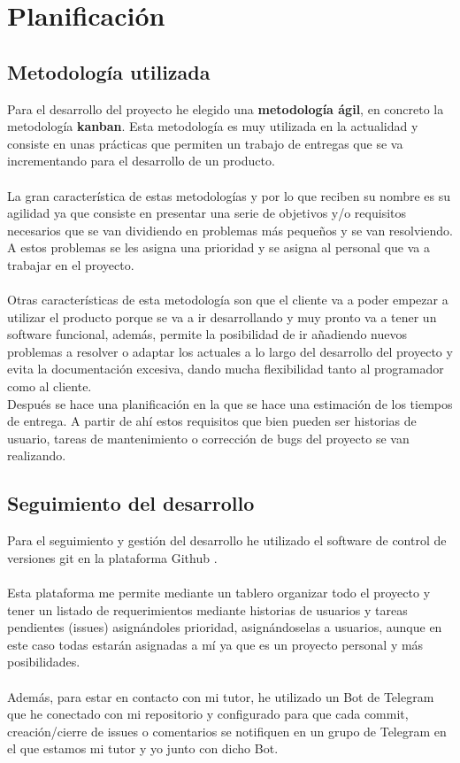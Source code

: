 \chapter{Planificación} \label{sec:planificacion}

\section{Metodología utilizada} \label{sec:metodologia}
Para el desarrollo del proyecto he elegido una \textbf{metodología ágil}, en concreto la metodología \textbf{kanban}.
Esta metodología es muy utilizada en la actualidad y consiste en unas prácticas que permiten un trabajo de entregas que se va incrementando para el desarrollo de un producto. \\\\
La gran característica de estas metodologías y por lo que reciben su nombre es su agilidad ya que consiste en presentar una serie de objetivos y/o requisitos necesarios que se van dividiendo en problemas más pequeños 
y se van resolviendo. A estos problemas se les asigna una prioridad y se asigna al personal que va a trabajar en el proyecto.\\\\
Otras características de esta metodología son que el cliente va a poder empezar a utilizar el producto porque se va a ir desarrollando y muy pronto va a tener un software funcional, 
además, permite la posibilidad de ir añadiendo nuevos problemas a resolver o adaptar los actuales a lo largo del desarrollo del proyecto y evita la documentación excesiva, dando mucha flexibilidad tanto al programador como al cliente.\\

Después se hace una planificación en la que se hace una estimación de los tiempos de entrega.
A partir de ahí estos requisitos que bien pueden ser historias de usuario, tareas de mantenimiento o corrección de bugs del proyecto se van realizando.
 
\newpage
\section{Seguimiento del desarrollo} \label{sec:seguimiento}

Para el seguimiento y gestión del desarrollo he utilizado el software de control de versiones
git \cite{git} en la plataforma Github \cite{Github}.\\\\
Esta plataforma me permite mediante un tablero organizar todo el proyecto
y tener un listado de requerimientos mediante historias de usuarios y tareas pendientes (issues) asignándoles
prioridad, asignándoselas a usuarios, aunque en este caso todas estarán asignadas a mí ya que es un proyecto personal 
y más posibilidades.\\\\
Además, para estar en contacto con mi tutor, he utilizado un Bot de Telegram que he conectado con mi repositorio y 
configurado para que cada commit, creación/cierre de issues o comentarios se notifiquen en un grupo de Telegram en el que estamos mi tutor y yo
junto con dicho Bot.\\

